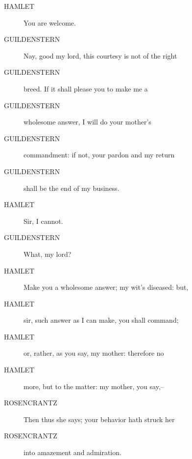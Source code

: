 \documentclass{article}
\begin{document}
\begin{description}
            
\item[HAMLET] You are welcome.
\end{description}
          
\begin{description}
            
\item[GUILDENSTERN] Nay, good my lord, this courtesy is not of the right
\item[GUILDENSTERN] breed. If it shall please you to make me a
\item[GUILDENSTERN] wholesome answer, I will do your mother's
\item[GUILDENSTERN] commandment: if not, your pardon and my return
\item[GUILDENSTERN] shall be the end of my business.
\end{description}
          
\begin{description}
            
\item[HAMLET] Sir, I cannot.
\end{description}
          
\begin{description}
            
\item[GUILDENSTERN] What, my lord?
\end{description}
          
\begin{description}
            
\item[HAMLET] Make you a wholesome answer; my wit's diseased: but,
\item[HAMLET] sir, such answer as I can make, you shall command;
\item[HAMLET] or, rather, as you say, my mother: therefore no
\item[HAMLET] more, but to the matter: my mother, you say,--
\end{description}
          
\begin{description}
            
\item[ROSENCRANTZ] Then thus she says; your behavior hath struck her
\item[ROSENCRANTZ] into amazement and admiration.
\end{description}
          
\end{document}
